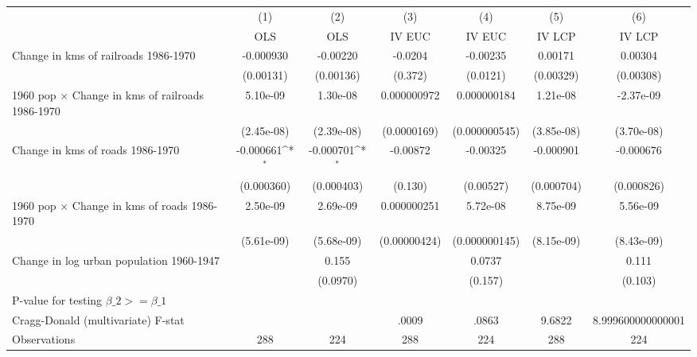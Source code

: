 {
\def\sym#1{\ifmmode^{#1}\else\(^{#1}\)\fi}
\begin{tabular}{l*{6}{c}}
\hline\hline
                &\multicolumn{1}{c}{(1)}&\multicolumn{1}{c}{(2)}&\multicolumn{1}{c}{(3)}&\multicolumn{1}{c}{(4)}&\multicolumn{1}{c}{(5)}&\multicolumn{1}{c}{(6)}\\
                &\multicolumn{1}{c}{OLS}&\multicolumn{1}{c}{OLS}&\multicolumn{1}{c}{IV EUC}&\multicolumn{1}{c}{IV EUC}&\multicolumn{1}{c}{IV LCP}&\multicolumn{1}{c}{IV LCP}\\
\hline
Change in kms of railroads 1986-1970&-0.000930         & -0.00220         &  -0.0204         & -0.00235         &  0.00171         &  0.00304         \\
                &(0.00131)         &(0.00136)         &  (0.372)         & (0.0121)         &(0.00329)         &(0.00308)         \\
[1em]
1960 pop $\times$ Change in kms of railroads 1986-1970& 5.10e-09         & 1.30e-08         &0.000000972         &0.000000184         & 1.21e-08         &-2.37e-09         \\
                &(2.45e-08)         &(2.39e-08)         &(0.0000169)         &(0.000000545)         &(3.85e-08)         &(3.70e-08)         \\
[1em]
Change in kms of roads 1986-1970&-0.000661\sym{*}  &-0.000701\sym{*}  & -0.00872         & -0.00325         &-0.000901         &-0.000676         \\
                &(0.000360)         &(0.000403)         &  (0.130)         &(0.00527)         &(0.000704)         &(0.000826)         \\
[1em]
1960 pop $\times$ Change in kms of roads 1986-1970& 2.50e-09         & 2.69e-09         &0.000000251         & 5.72e-08         & 8.75e-09         & 5.56e-09         \\
                &(5.61e-09)         &(5.68e-09)         &(0.00000424)         &(0.000000145)         &(8.15e-09)         &(8.43e-09)         \\
[1em]
Change in log urban population 1960-1947&                  &    0.155         &                  &   0.0737         &                  &    0.111         \\
                &                  & (0.0970)         &                  &  (0.157)         &                  &  (0.103)         \\
\hline
P-value for testing $\beta\_{2} >= \beta\_{1}$&                  &                  &                  &                  &                  &                  \\
Cragg-Donald (multivariate) F-stat&                  &                  &    .0009         &    .0863         &   9.6822         &8.999600000000001         \\
Observations    &      288         &      224         &      288         &      224         &      288         &      224         \\
\hline\hline
\end{tabular}
}
